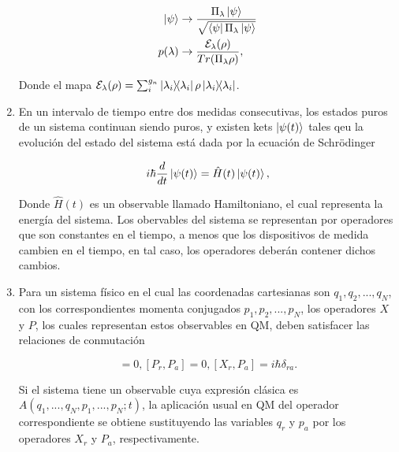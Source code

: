 \documentclass[xetex,mathserif,serif]{beamer}
\begin{document}
\begin{frame}
\begin{enumerate}
        \begin{align}
            \ket{\psi} &\rightarrow \frac{\Pi_\lambda \ket{\psi}}{\sqrt{\bra{\psi} \Pi_\lambda \ket{\psi}}} \\
            p(\lambda) &\rightarrow \frac{\mathcal{E}_\lambda(\rho)}{Tr(\Pi_\lambda \rho)} ,
        \end{align}

        Donde el mapa $\mathcal{E}_\lambda(\rho) = \sum_i^{g_n} \ketbra{\lambda_i} \rho \ketbra{\lambda_i}$.

    \item En un intervalo de tiempo entre dos medidas consecutivas, los estados puros de un sistema continuan siendo puros, y existen kets $\ket{\psi(t)}$ tales qeu la evolución del estado del sistema está dada por la ecuación de Schrödinger

        \begin{equation}
            i \hbar \frac{d}{dt} \ket{\psi(t)} = \hat{H}(t) \ket{\psi(t)} ,
        \end{equation}

        Donde $\hat{H}(t)$ es un observable llamado Hamiltoniano, el cual representa la energía del sistema. Los obervables del sistema se representan por operadores que son constantes en el tiempo, a menos que los dispositivos de medida cambien en el tiempo, en tal caso, los operadores deberán contener dichos cambios.
    \item Para un sistema físico en el cual las coordenadas cartesianas son $q_1, q_2, ... , q_N$, con los correspondientes momenta conjugados $p_1, p_2, ... , p_N$, los operadores $X$ y $P$, los cuales representan estos observables en QM, deben satisfacer las relaciones de conmutación

        \begin{equation}
            [X_r, X_a] = 0, [P_r, P_a] = 0, [X_r, P_a] = i \hbar \delta_{ra} .
        \end{equation}

        Si el sistema tiene un observable cuya expresión clásica es $A(q_1, ... , q_N, p_1, ... , p_N; t)$, la aplicación usual en QM del operador correspondiente se obtiene sustituyendo las variables $q_r$ y $p_a$ por los operadores $X_r$ y $P_a$, respectivamente.
\end{enumerate}

\end{frame}
\end{document}
